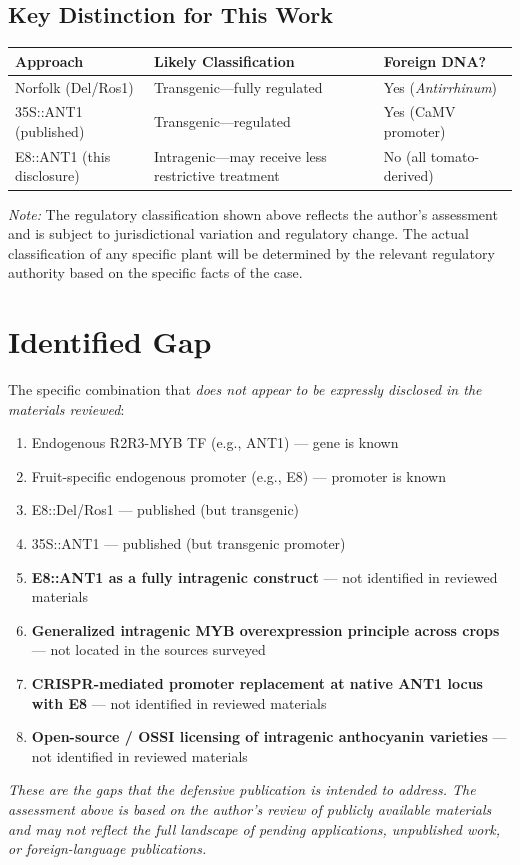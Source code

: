 \documentclass[12pt,a4paper]{article}
\begin{document}
\subsection{Key Distinction for This Work}

\begin{longtable}{p{4cm} p{4cm} p{4cm}}
\toprule
\textbf{Approach} & \textbf{Likely Classification} & \textbf{Foreign DNA?} \\
\midrule
Norfolk (Del/Ros1) & Transgenic---fully regulated & Yes (\textit{Antirrhinum}) \\
\addlinespace
35S::ANT1 (published) & Transgenic---regulated & Yes (CaMV promoter) \\
\addlinespace
E8::ANT1 (this disclosure) & Intragenic---may receive less restrictive treatment & No (all tomato-derived) \\
\bottomrule
\end{longtable}

\noindent\textit{Note:} The regulatory classification shown above reflects the author's assessment and is subject to jurisdictional variation and regulatory change. The actual classification of any specific plant will be determined by the relevant regulatory authority based on the specific facts of the case.

\section{Identified Gap}

The specific combination that \textit{does not appear to be expressly disclosed in the materials reviewed}:

\begin{enumerate}
  \item[\checkmark] Endogenous R2R3-MYB TF (e.g., ANT1) --- gene is known
  \item[\checkmark] Fruit-specific endogenous promoter (e.g., E8) --- promoter is known
  \item[\checkmark] E8::Del/Ros1 --- published (but transgenic)
  \item[\checkmark] 35S::ANT1 --- published (but transgenic promoter)
  \item[$\times$] \textbf{E8::ANT1 as a fully intragenic construct} --- not identified in reviewed materials
  \item[$\times$] \textbf{Generalized intragenic MYB overexpression principle across crops} --- not located in the sources surveyed
  \item[$\times$] \textbf{CRISPR-mediated promoter replacement at native ANT1 locus with E8} --- not identified in reviewed materials
  \item[$\times$] \textbf{Open-source / OSSI licensing of intragenic anthocyanin varieties} --- not identified in reviewed materials
\end{enumerate}

\noindent\textit{These are the gaps that the defensive publication is intended to address. The assessment above is based on the author's review of publicly available materials and may not reflect the full landscape of pending applications, unpublished work, or foreign-language publications.}
\end{document}
